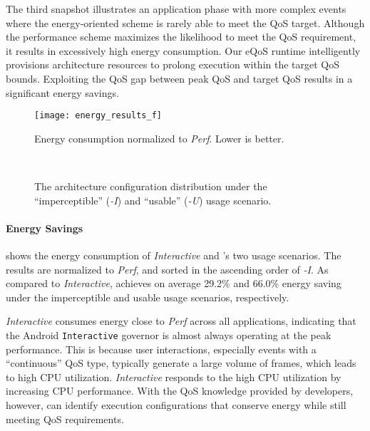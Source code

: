 The third snapshot illustrates an application phase with more complex events where the energy-oriented scheme is rarely able to meet the QoS target. Although the performance scheme maximizes the likelihood to meet the QoS requirement, it results in excessively high energy consumption. Our eQoS runtime intelligently provisions architecture resources to prolong execution within the target QoS bounds. Exploiting the QoS gap between peak QoS and target QoS results in a significant energy savings.

\begin{figure}[t]
\centering
\texttt{[image: energy\_results\_f]}
\caption{Energy consumption normalized to \textit{Perf}. Lower is better.}
\label{fig:energy_results_f}
\end{figure}

\begin{figure}[p]
\centering
{}\\
\vspace*{25pt}
\caption{The architecture configuration distribution under the ``imperceptible'' (\textit{\ebs-I}) and ``usable''  (\textit{\ebs-U}) usage scenario.}
\label{fig:freq_dist}
\end{figure}

\paragraph{Energy Savings}  shows the energy consumption of \textit{Interactive} and \ebs's two usage scenarios. The results are normalized to \textit{Perf}, and sorted in the ascending order of \textit{\ebs-I}. As compared to \textit{Interactive}, \ebs achieves on average 29.2\% and 66.0\% energy saving under the imperceptible and usable usage scenarios, respectively.

\textit{Interactive} consumes energy close to \textit{Perf} across all applications, indicating that the Android \texttt{Interactive} governor is almost always operating at the peak performance. This is because user interactions, especially events with a ``continuous'' QoS type, typically generate a large volume of frames, which leads to high CPU utilization. \textit{Interactive} responds to the high CPU utilization by increasing CPU performance. With the QoS knowledge provided by developers, however, \ebs can identify execution configurations that conserve energy while still meeting QoS requirements.

